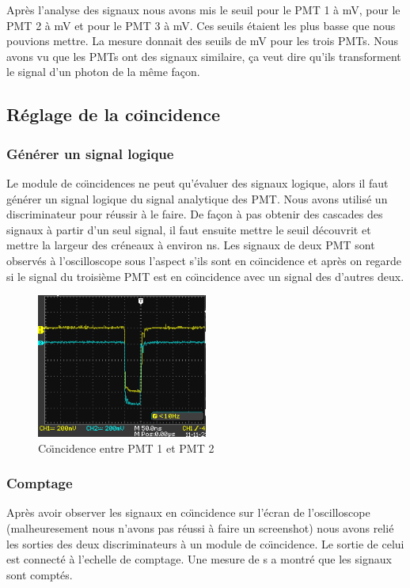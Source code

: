 \documentclass[a4paper,11pt,liststotocnumbered,bibtotocnumbered]{scrartcl}
\begin{document}
 Après l'analyse des signaux nous avons mis le seuil pour le PMT 1 à \unit[19]{mV}, pour le PMT 2 à \unit[25]{mV} et pour le PMT 3 à \unit[24]{mV}. Ces seuils étaient les plus basse que nous pouvions mettre. La mesure donnait des seuils de \unit[15]{mV} pour les trois PMTs. Nous avons vu que les PMTs ont des signaux similaire, \c ca veut dire qu'ils transforment le signal d'un photon de la même fa\c con.
  

  \subsection{Réglage de la co\"{\i}ncidence}

   \subsubsection{Générer un signal logique}
      Le module de co\"{\i}ncidences ne peut qu'évaluer des signaux logique, alors il faut générer un signal logique du signal analytique des PMT. Nous avons utilisé un discriminateur pour réussir à le faire. De fa\c con à pas obtenir des cascades des signaux à partir d'un seul signal, il faut ensuite mettre le seuil découvrit et mettre la largeur des créneaux à environ \unit[600]{ns}. Les signaux de deux PMT sont observés à l'oscilloscope sous l'aspect s'ils sont en co\"{\i}ncidence et après on regarde si le signal du troisième PMT est en co\"{\i}ncidence avec un signal des d'autres deux.
    \begin{figure}
     \centering
     \includegraphics[width=0.5\textwidth]{bilder/coinvrai.png}
     \caption{Co\"{\i}ncidence entre PMT 1 et PMT 2}
    \end{figure}
  
   
  
   \subsubsection{Comptage}
    Après avoir observer les signaux en co\"{\i}ncidence sur l'écran de l'oscilloscope (malheuresement nous n'avons pas réussi à faire un screenshot) nous avons relié les sorties des deux discriminateurs à un module de co\"{\i}ncidence. Le sortie de celui est connecté à l'echelle de comptage. Une mesure de \unit[30]{s} a montré que les signaux sont comptés.
   
\end{document}
